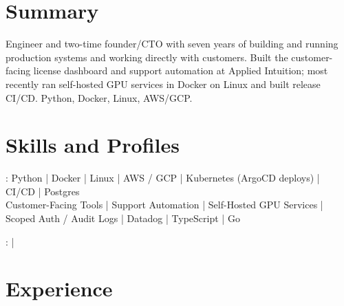 \documentclass[print]{jack-resume}
\begin{document}
\pagecolor{darkmodeBackground}


\begin{minipage}[t][1cm][t]{.03\textwidth}
    \hfill
\end{minipage}

\section{Summary}
Engineer and two-time founder/CTO with seven years of building and running production systems and working directly with customers. Built the customer-facing license dashboard and support automation at Applied Intuition; most recently ran self-hosted GPU services in Docker on Linux and built release CI/CD. Python, Docker, Linux, AWS/GCP.
\sectionsep

\section{Skills and Profiles}
:
Python \hfill | \hfill
Docker \hfill | \hfill
Linux \hfill | \hfill
AWS / GCP \hfill | \hfill
Kubernetes (ArgoCD deploys) \hfill | \hfill
CI/CD \hfill | \hfill
Postgres \\
\hspace{1.0cm} Customer-Facing Tools \hfill | \hfill
Support Automation \hfill | \hfill
Self-Hosted GPU Services \hfill | \hfill
Scoped Auth / Audit Logs \hfill | \hfill
Datadog \hfill | \hfill
TypeScript \hfill | \hfill
Go \\

\raggedright{
    :
      \href{https://www.linkedin.com/in/jack-sturtevant/}{ \ExternalLink} |
     \href{https://github.com/jacksturt}{ \ExternalLink}}

\section{Experience}
\end{document}
